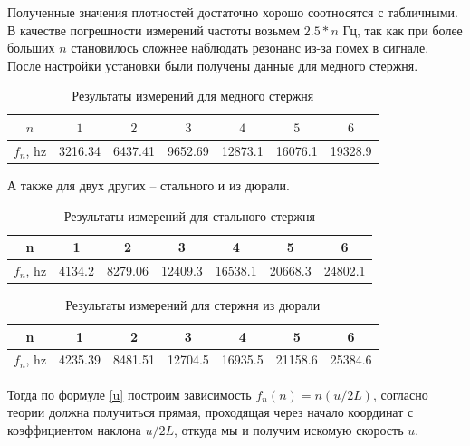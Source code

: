 \documentclass[a4paper,12pt]{article}
\begin{document}
	Полученные значения плотностей достаточно хорошо соотносятся с табличными.\\
	
	В качестве погрешности измерений частоты возьмем $2.5*n$ Гц, так как при более больших $n$ становилось сложнее наблюдать резонанс из-за помех в сигнале.\\
	
	После настройки установки были получены данные для медного стержня.\\
	
	\begin{table}[H]
	\centering
	\caption{Результаты измерений для медного стержня}
	\begin{tabular}{|c|c|c|c|c|c|c|}
	 	\hline
		 $n$ & $1$ & $2$ & $3$ & $4$ & $5$ & $6$ \\
	 	\hline
	 	$f_n$, hz & 3216.34 & 6437.41 & 9652.69 & 12873.1 & 16076.1 & 19328.9 \\
	 	\hline
	\end{tabular}
	\end{table}
	
	А также для двух других -- стального и из дюрали.
	
	\begin{table}[H]
	\centering
	\caption{Результаты измерений для стального стержня}
	\begin{tabular}{|c|c|c|c|c|c|c|}
		\hline
		n & 1 & 2 & 3 & 4 & 5 & 6 \\
		\hline
		$f_n$, hz & 4134.2 & 8279.06 & 12409.3 & 16538.1 & 20668.3 & 24802.1 \\
		\hline
	\end{tabular}
	\end{table}
	
	\begin{table}[H]
	\centering
	\caption{Результаты измерений для стержня из дюрали}
	\begin{tabular}{|c|c|c|c|c|c|c|}
		\hline
		n & 1 & 2 & 3 & 4 & 5 & 6 \\
		\hline
		$f_n$, hz & 4235.39 & 8481.51 & 12704.5 & 16935.5 & 21158.6 & 25384.6 \\
		\hline
	\end{tabular}
	\end{table}
	
	Тогда по формуле \eqref{u} построим зависимость $f_n(n)=n(u/2L)$, согласно теории должна получиться прямая, проходящая через начало координат с коэффициентом наклона $u/2L$, откуда мы и получим искомую скорость $u$.\\
	
\end{document}
